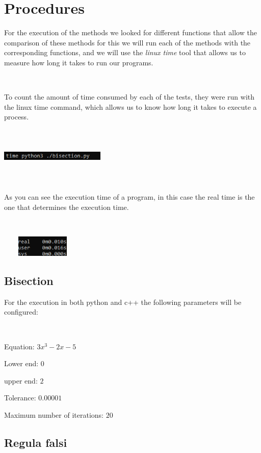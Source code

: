 \documentclass[conference]{IEEEtran}
\begin{document}
\section{Procedures}


For the execution of the methods we looked for different functions that allow the comparison of these methods for this we will run each of the methods with the corresponding functions, and we will use the \textit{linux time} tool that allows us to measure how long it takes to run our programs.

\


To count the amount of time consumed by each of the tests, they were run with the linux time command, which allows us to know how long it takes to execute a process.


\


\includegraphics[width=5cm, height= 1cm]{com.PNG}


\

As you can see the execution time of a program, in this case the real time is the one that determines the execution time.

\


\includegraphics[width=4cm, height= 1cm]{con2.PNG}


\subsection{Bisection}

For the execution in both python and c++ the following parameters will be configured:

\

Equation: \(3x^3 - 2x -5\) 

Lower end: \(0\)

upper end: \(2\)

Tolerance: \(0.00001\) 

Maximum number of iterations: \(20\)



\subsection{Regula falsi}
\end{document}
